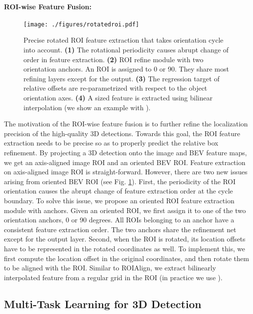 \documentclass[10pt,twocolumn,letterpaper]{article}
\begin{document}
\paragraph{ROI-wise Feature Fusion:}
\begin{figure}[t]
\begin{center}
 \texttt{[image: ./figures/rotatedroi.pdf]}
\end{center}
   \caption{Precise rotated ROI feature extraction that takes orientation cycle into account. \textbf{(1)} The rotational periodicity causes abrupt change of order in feature extraction. \textbf{(2)} ROI refine module with two orientation anchors. An ROI is assigned to 0 or 90. They share most refining layers except for the output. \textbf{(3)} The regression target of relative offsets are re-parametrized with respect to the object orientation axes. \textbf{(4)} A  sized feature is extracted using bilinear interpolation (we show an example with ).}
\label{fig:roi}
\end{figure}
The motivation of the ROI-wise feature fusion is to further refine the localization precision of the high-quality 3D detections. Towards this goal, the ROI feature extraction needs to be precise so as to properly predict the relative box refinement. By projecting a 3D detection onto the image and BEV feature maps, we get an axis-aligned image ROI and an oriented BEV ROI. Feature extraction on axis-aligned image ROI is straight-forward. However, there are two new issues arising from oriented BEV ROI (see Fig. \ref{fig:roi}). First, the periodicity of the ROI orientation causes the abrupt change of feature extraction order at the cycle boundary. To solve this issue, we propose an oriented ROI feature extraction module with anchors. Given an oriented ROI, we first assign it to one of the two orientation anchors, 0 or 90 degrees. All ROIs belonging to an anchor have a consistent feature extraction order. The two anchors share the refinement net except for the output layer. Second, when the ROI is rotated, its location offsets have to be represented in the rotated coordinates as well. To implement this, we first compute the location offset in the original coordinates, and then rotate them to be aligned with the ROI. Similar to ROIAlign\cite{maskrcnn}, we extract bilinearly interpolated feature from a  regular grid in the ROI (in practice we use ).


\subsection{Multi-Task Learning for 3D Detection}
\end{document}
